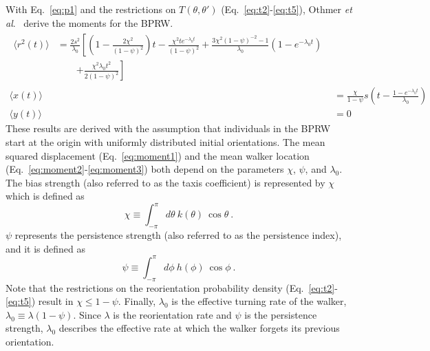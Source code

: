 With Eq.\ \ref{eq:p1} and the restrictions on $T(\theta,\theta')$ (Eq.\ \ref{eq:t2}-\ref{eq:t5}), Othmer \textit{et al}.\ \cite{othmer1988models} derive the moments for the BPRW.
\begin{align} \label{eq:moment1}
    \begin{split}
    \langle r^2(t) \rangle &= \frac{2s^2}{\lambda_0} \left[ \left(1-\frac{2\chi^2}{(1-\psi)^2}\right)t
    - \frac{\chi^2 t e^{-\lambda_0 t}}{(1-\psi)^2}
    + \frac{3\chi^2(1-\psi)^{-2}-1}{\lambda_0} \left(1-e^{-\lambda_0 t}\right)
    \right. \\
    &\qquad \left.
    + \frac{\chi^2 \lambda_0 t^2}{2(1-\psi)^2} \right]
    \end{split} \\
    \langle x(t) \rangle &= \frac{\chi}{1-\psi} s \left(t -\frac{1-e^{-\lambda_0 t}}{\lambda_0} \right) \label{eq:moment2} \\
    \langle y(t) \rangle &= 0 \label{eq:moment3}
\end{align}
These results are derived with the assumption that individuals in the BPRW start at the origin with uniformly distributed initial orientations.
The mean squared displacement (Eq.\ \ref{eq:moment1}) and the mean walker location (Eq.\ \ref{eq:moment2}-\ref{eq:moment3}) both depend on the parameters $\chi$, $\psi$, and $\lambda_0$. The bias strength (also referred to as the taxis coefficient) is represented by $\chi$ which is defined as
\begin{equation} \label{eq:chi}
    \chi \equiv \int_{-\pi}^{\pi} d\theta \ k(\theta) \ \cos\theta \ .
\end{equation}
$\psi$ represents the persistence strength (also referred to as the persistence index), and it is defined as
\begin{equation} \label{eq:psi}
    \psi \equiv \int_{-\pi}^{\pi} d\phi \ h(\phi) \ \cos\phi \ .
\end{equation}
Note that the restrictions on the reorientation probability density (Eq.\ \ref{eq:t2}-\ref{eq:t5}) result in $\chi \leq 1 - \psi$. Finally, $\lambda_0$ is the effective turning rate of the walker,
$\lambda_0 \equiv \lambda(1-\psi)$.
Since $\lambda$ is the reorientation rate and $\psi$ is the persistence strength, $\lambda_0$ describes the effective rate at which the walker forgets its previous orientation.


